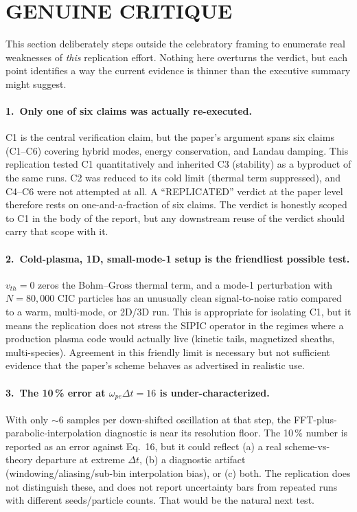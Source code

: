 \documentclass[11pt]{article}
\begin{document}
\section{GENUINE CRITIQUE}
This section deliberately steps outside the celebratory framing to
enumerate real weaknesses of \emph{this} replication effort. Nothing
here overturns the verdict, but each point identifies a way the current
evidence is thinner than the executive summary might suggest.

\paragraph{1.\ Only one of six claims was actually re-executed.}
C1 is the central verification claim, but the paper's argument spans
six claims (C1--C6) covering hybrid modes, energy conservation, and
Landau damping. This replication tested C1 quantitatively and inherited
C3 (stability) as a byproduct of the same runs. C2 was reduced to its
cold limit (thermal term suppressed), and C4--C6 were not attempted at
all. A ``REPLICATED'' verdict at the paper level therefore rests on
one-and-a-fraction of six claims. The verdict is honestly scoped to C1
in the body of the report, but any downstream reuse of the verdict
should carry that scope with it.

\paragraph{2.\ Cold-plasma, 1D, small-mode-1 setup is the friendliest
possible test.} $v_{th}=0$ zeros the Bohm--Gross thermal term, and a
mode-1 perturbation with $N=80{,}000$ CIC particles has an unusually
clean signal-to-noise ratio compared to a warm, multi-mode, or 2D/3D
run. This is appropriate for isolating C1, but it means the
replication does not stress the SIPIC operator in the regimes where a
production plasma code would actually live (kinetic tails, magnetized
sheaths, multi-species). Agreement in this friendly limit is necessary
but not sufficient evidence that the paper's scheme behaves as
advertised in realistic use.

\paragraph{3.\ The 10\,\% error at $\omega_{pe}\Delta t = 16$ is
under-characterized.} With only $\sim$6 samples per down-shifted
oscillation at that step, the FFT-plus-parabolic-interpolation
diagnostic is near its resolution floor. The 10\,\% number is reported
as an error against Eq.~16, but it could reflect (a) a real
scheme-vs-theory departure at extreme $\Delta t$, (b) a diagnostic
artifact (windowing/aliasing/sub-bin interpolation bias), or (c) both.
The replication does not distinguish these, and does not report
uncertainty bars from repeated runs with different seeds/particle
counts. That would be the natural next test.
\end{document}
